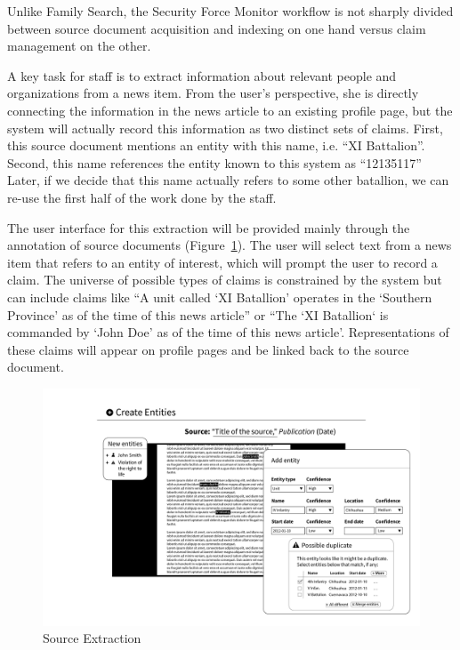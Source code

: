 \documentclass[format=siggraph, review=true]{acmart}
\begin{document}
Unlike Family Search, the Security Force Monitor workflow is
not sharply divided between source document acquisition and indexing
on one hand versus claim management on the other.

A key task for staff is to extract information about relevant
people and organizations from a news item. From the user's
perspective, she is directly connecting the information in the news
article to an existing profile page, but the system will actually record
this information as two distinct sets of claims. First, this source
document mentions an entity with this name, i.e. ``XI
Battalion''. Second, this name references the entity known to this
system as ``12135117'' Later, if we decide that this name actually
refers to some other batallion, we can re-use the first half of the
work done by the staff.

The user interface for this extraction will be provided mainly through the
annotation of source documents (Figure~\ref{fig:new-entities}). The user
will select text from a news item that refers to an entity of
interest, which will prompt the user to record a claim. The universe
of possible types of claims is constrained by the system but can
include claims like ``A unit called `XI Batallion' operates in the
`Southern Province' as of the time of this news article'' or ``The `XI
Batallion` is commanded by `John Doe' as of the time of this news
article'. Representations of these claims will appear on profile pages
and be linked back to the source document.

\begin{figure}[h]
\includegraphics[width=\columnwidth]{images/sketches/new-entities.png}
\caption{Source Extraction}
\label{fig:new-entities}
\end{figure}
\end{document}
